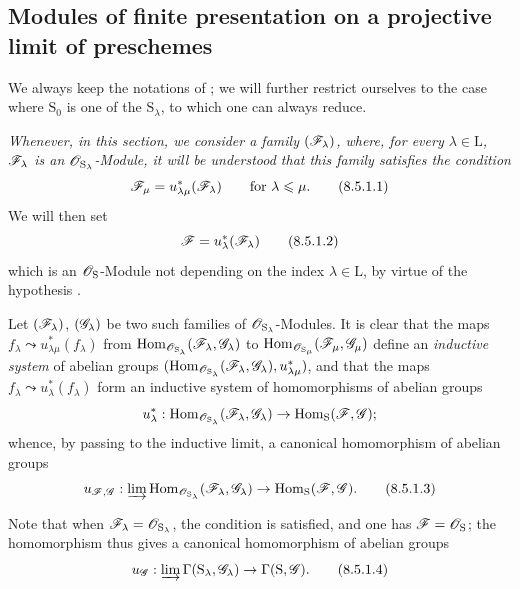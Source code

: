\subsection{Modules of finite presentation on a projective limit of preschemes}
\label{subsection:IV.8.5}

\begin{env}[8.5.1]
\label{IV.8.5.1}
We always keep the notations of ; we will further restrict ourselves to the case where $\mathrm{S}_0$ is one of the $\mathrm{S}_\lambda$, to which one can always reduce.

\emph{Whenever, in this section, we consider a family $(\mathscr{F}_\lambda)$, where, for every $\lambda\in\mathrm{L}$, $\mathscr{F}_\lambda$ is an $\mathscr{O}_{\mathrm{S}_\lambda}$-Module, it will be understood that this family satisfies the condition}
\begin{equation}
  \mathscr{F}_\mu=u_{\lambda\mu}^*(\mathscr{F}_\lambda) \qquad\text{for }\lambda\leqslant\mu.
  \tag{8.5.1.1}
\label{IV.8.5.1.1}
\end{equation}
We will then set
\begin{equation}
  \mathscr{F}=u_\lambda^*(\mathscr{F}_\lambda)
  \label{IV.8.5.1.2}
\tag{8.5.1.2}
\end{equation}
which is an $\mathscr{O}_\mathrm{S}$-Module not depending on the index $\lambda\in\mathrm{L}$, by virtue of the hypothesis .

Let $(\mathscr{F}_\lambda)$, $(\mathscr{G}_\lambda)$ be two such families of $\mathscr{O}_{\mathrm{S}_\lambda}$-Modules.
It is clear that the maps $f_\lambda\leadsto u_{\lambda\mu}^*(f_\lambda)$ from $\operatorname{Hom}_{\mathscr{O}_{\mathrm{S}_\lambda}}(\mathscr{F}_\lambda,\mathscr{G}_\lambda)$ to $\operatorname{Hom}_{\mathscr{O}_{\mathrm{S}_\mu}}(\mathscr{F}_\mu,\mathscr{G}_\mu)$ define an \emph{inductive system} of abelian groups $(\operatorname{Hom}_{\mathscr{O}_{\mathrm{S}_\lambda}}(\mathscr{F}_\lambda,\mathscr{G}_\lambda),u_{\lambda\mu}^*)$, and that the maps $f_\lambda\leadsto u_\lambda^*(f_\lambda)$ form an inductive system of homomorphisms of abelian groups
\[
  u_\lambda^*:\operatorname{Hom}_{\mathscr{O}_{\mathrm{S}_\lambda}}(\mathscr{F}_\lambda,\mathscr{G}_\lambda)\to\operatorname{Hom}_\mathrm{S}(\mathscr{F},\mathscr{G});
\]
whence, by passing to the inductive limit, a canonical homomorphism of abelian groups
\begin{equation}
  u_{\mathscr{F},\mathscr{G}}:\varinjlim\operatorname{Hom}_{\mathscr{O}_{\mathrm{S}_\lambda}}(\mathscr{F}_\lambda,\mathscr{G}_\lambda)\to\operatorname{Hom}_\mathrm{S}(\mathscr{F},\mathscr{G}).
  \tag{8.5.1.3}
\label{IV.8.5.1.3}
\end{equation}

Note that when $\mathscr{F}_\lambda=\mathscr{O}_{\mathrm{S}_\lambda}$, the condition  is satisfied, and one has $\mathscr{F}=\mathscr{O}_\mathrm{S}$; the homomorphism  thus gives  a canonical homomorphism of abelian groups
\begin{equation}
  u_{\mathscr{G}}:\varinjlim\Gamma(\mathrm{S}_\lambda,\mathscr{G}_\lambda)\to\Gamma(\mathrm{S},\mathscr{G}).
  \tag{8.5.1.4}
\label{IV.8.5.1.4}
\end{equation}
\end{env}

